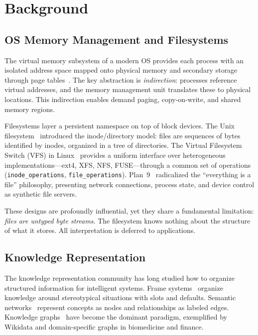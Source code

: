 \documentclass[12pt,a4paper]{article}
\theoremstyle{definition}
\begin{document}
\section{Background}\label{sec:background}

\subsection{OS Memory Management and Filesystems}\label{subsec:os-memory}

The virtual memory subsystem of a modern OS provides each process with an isolated address space mapped onto physical memory and secondary storage through page tables~\citep{denning1970virtual}.
The key abstraction is \emph{indirection}: processes reference virtual addresses, and the memory management unit translates these to physical locations.
This indirection enables demand paging, copy-on-write, and shared memory regions.

Filesystems layer a persistent namespace on top of block devices.
The Unix filesystem~\citep{ritchie1974unix} introduced the inode/directory model: files are sequences of bytes identified by inodes, organized in a tree of directories.
The Virtual Filesystem Switch (VFS) in Linux~\citep{love2010linux} provides a uniform interface over heterogeneous implementations---ext4, XFS, NFS, FUSE---through a common set of operations (\texttt{inode\_operations}, \texttt{file\_operations}).
Plan~9~\citep{pike1995plan9} radicalized the ``everything is a file'' philosophy, presenting network connections, process state, and device control as synthetic file servers.

These designs are profoundly influential, yet they share a fundamental limitation: \emph{files are untyped byte streams}.
The filesystem knows nothing about the structure of what it stores.
All interpretation is deferred to applications.

\subsection{Knowledge Representation}\label{subsec:kr}

The knowledge representation community has long studied how to organize structured information for intelligent systems.
Frame systems~\citep{minsky1974framework} organize knowledge around stereotypical situations with slots and defaults.
Semantic networks~\citep{quillian1968semantic} represent concepts as nodes and relationships as labeled edges.
Knowledge graphs~\citep{hogan2021knowledge} have become the dominant paradigm, exemplified by Wikidata and domain-specific graphs in biomedicine and finance.
\end{document}
